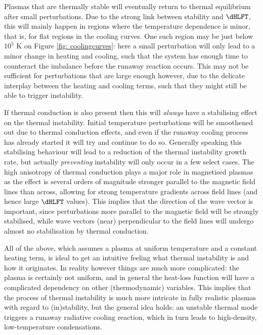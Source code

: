 Plasmas that are thermally stable will eventually return to thermal equilibrium after small perturbations. Due to the strong link between stability and $\dHLFT$, this will mainly happen in regions where the temperature dependence is minor, that is, for flat regions in the cooling curves. One such region may be just below $10^5$ K on Figure \ref{fig: coolingcurves}: here a small perturbation will only lead to a minor change in heating and cooling, such that the system has enough time to counteract the imbalance before the runaway reaction occurs. This may not be sufficient for perturbations that are large enough however, due to the delicate interplay between the heating and cooling terms, such that they might still be able to trigger instability.

If thermal conduction is also present then this will \emph{always} have a stabilising effect on the thermal instability. Initial temperature perturbations will be smoothened out due to thermal conduction effects, and even if the runaway cooling process has already started it will try and continue to do so. Generally speaking this stabilising behaviour will lead to a reduction of the thermal instability growth rate, but actually \emph{preventing} instability will only occur in a few select cases. The high anisotropy of thermal conduction plays a major role in magnetised plasmas as the effect is several orders of magnitude stronger parallel to the magnetic field lines than across, allowing for strong temperature gradients across field lines (and hence large $\dHLFT$ values). This implies that the direction of the wave vector is important, since perturbations more parallel to the magnetic field will be strongly stabilised, while wave vectors (near) perpendicular to the field lines will undergo almost no stabilisation by thermal conduction.

All of the above, which assumes a plasma at uniform temperature and a constant heating term, is ideal to get an intuitive feeling what thermal instability is and how it originates. In reality however things are much more complicated: the plasma is certainly not uniform, and in general the heat-loss function will have a complicated dependency on other (thermodynamic) variables. This implies that the process of thermal instability is much more intricate in fully realistic plasmas with regard to (in)stability, but the general idea holds: an unstable thermal mode triggers a runaway radiative cooling reaction, which in turn leads to high-density, low-temperature condensations.


